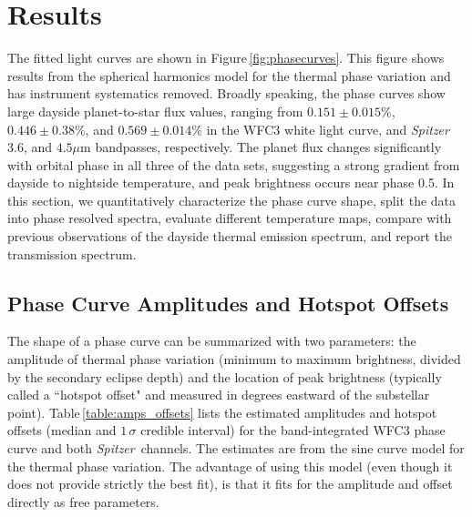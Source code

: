 \documentclass[twocolumn, trackchanges]{aastex61}
\newcommand{\project}[1]{\textsl{#1}}
\newcommand{\Spitzer}{\project{Spitzer}}
\begin{document}
\section{Results}
\label{sec:results}
The fitted light curves are shown in Figure\,\ref{fig:phasecurves}. This figure shows results from the spherical harmonics model for the thermal phase variation and has instrument systematics removed.  Broadly speaking, the phase curves show large dayside planet-to-star flux values, ranging from $0.151\pm0.015\%$, $0.446\pm0.38\%$, and $0.569\pm0.014\%$ in the WFC3 white light curve, and \Spitzer\ $3.6$, and $4.5\mu$m bandpasses, respectively.  The planet flux changes significantly with orbital phase in all three of the data sets, suggesting a strong gradient from dayside to nightside temperature, and peak brightness occurs near phase 0.5. In this section, we quantitatively characterize the phase curve shape, split the data into phase resolved spectra, evaluate different temperature maps, compare with previous observations of the dayside thermal emission spectrum, and report the transmission spectrum.


\subsection{Phase Curve Amplitudes and Hotspot Offsets}
The shape of a phase curve can be summarized with two parameters: the amplitude of thermal phase variation (minimum to maximum brightness, divided by the secondary eclipse depth) and the location of peak brightness (typically called a ``hotspot offset" and measured in degrees eastward of the substellar point).  Table\,\ref{table:amps_offsets} lists the estimated amplitudes and hotspot offsets (median and $1\,\sigma$ credible interval) for the band-integrated WFC3 phase curve and both \Spitzer\ channels. The estimates are from the sine curve model for the thermal phase variation. The advantage of using this model (even though it does not provide strictly the best fit), is that it fits for the amplitude and offset directly as free parameters. 

\end{document}
